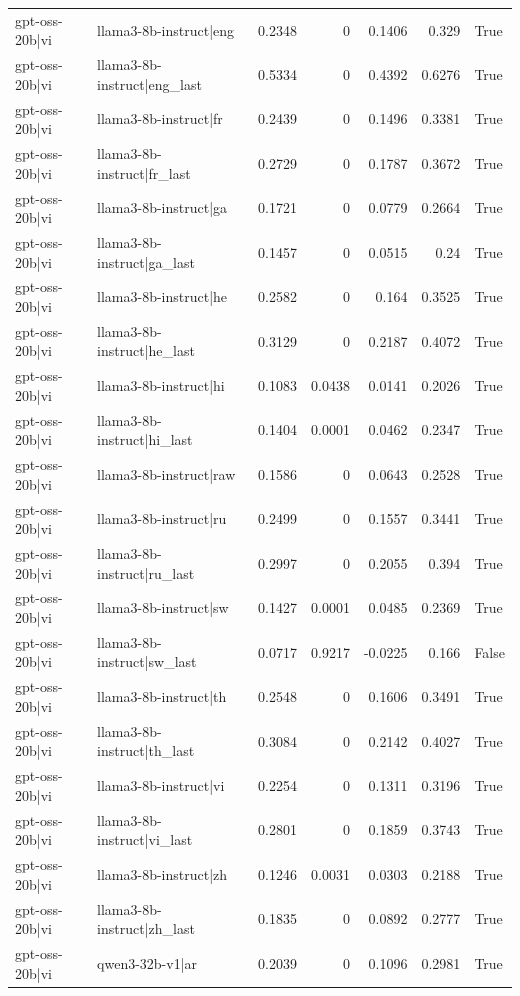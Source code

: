 \begin{table}
\begin{tabular}{l l r r r r l}
gpt-oss-20b|vi & llama3-8b-instruct|eng & 0.2348 & 0 & 0.1406 & 0.329 & True \\
gpt-oss-20b|vi & llama3-8b-instruct|eng_last & 0.5334 & 0 & 0.4392 & 0.6276 & True \\
gpt-oss-20b|vi & llama3-8b-instruct|fr & 0.2439 & 0 & 0.1496 & 0.3381 & True \\
gpt-oss-20b|vi & llama3-8b-instruct|fr_last & 0.2729 & 0 & 0.1787 & 0.3672 & True \\
gpt-oss-20b|vi & llama3-8b-instruct|ga & 0.1721 & 0 & 0.0779 & 0.2664 & True \\
gpt-oss-20b|vi & llama3-8b-instruct|ga_last & 0.1457 & 0 & 0.0515 & 0.24 & True \\
gpt-oss-20b|vi & llama3-8b-instruct|he & 0.2582 & 0 & 0.164 & 0.3525 & True \\
gpt-oss-20b|vi & llama3-8b-instruct|he_last & 0.3129 & 0 & 0.2187 & 0.4072 & True \\
gpt-oss-20b|vi & llama3-8b-instruct|hi & 0.1083 & 0.0438 & 0.0141 & 0.2026 & True \\
gpt-oss-20b|vi & llama3-8b-instruct|hi_last & 0.1404 & 0.0001 & 0.0462 & 0.2347 & True \\
gpt-oss-20b|vi & llama3-8b-instruct|raw & 0.1586 & 0 & 0.0643 & 0.2528 & True \\
gpt-oss-20b|vi & llama3-8b-instruct|ru & 0.2499 & 0 & 0.1557 & 0.3441 & True \\
gpt-oss-20b|vi & llama3-8b-instruct|ru_last & 0.2997 & 0 & 0.2055 & 0.394 & True \\
gpt-oss-20b|vi & llama3-8b-instruct|sw & 0.1427 & 0.0001 & 0.0485 & 0.2369 & True \\
gpt-oss-20b|vi & llama3-8b-instruct|sw_last & 0.0717 & 0.9217 & -0.0225 & 0.166 & False \\
gpt-oss-20b|vi & llama3-8b-instruct|th & 0.2548 & 0 & 0.1606 & 0.3491 & True \\
gpt-oss-20b|vi & llama3-8b-instruct|th_last & 0.3084 & 0 & 0.2142 & 0.4027 & True \\
gpt-oss-20b|vi & llama3-8b-instruct|vi & 0.2254 & 0 & 0.1311 & 0.3196 & True \\
gpt-oss-20b|vi & llama3-8b-instruct|vi_last & 0.2801 & 0 & 0.1859 & 0.3743 & True \\
gpt-oss-20b|vi & llama3-8b-instruct|zh & 0.1246 & 0.0031 & 0.0303 & 0.2188 & True \\
gpt-oss-20b|vi & llama3-8b-instruct|zh_last & 0.1835 & 0 & 0.0892 & 0.2777 & True \\
gpt-oss-20b|vi & qwen3-32b-v1|ar & 0.2039 & 0 & 0.1096 & 0.2981 & True \\

\end{tabular}
\end{table}

